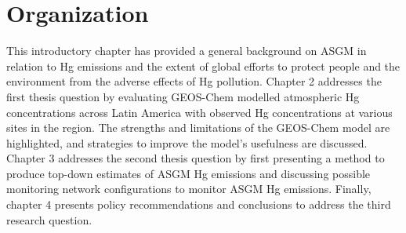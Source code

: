  
\section{Organization}

This introductory chapter has provided a general background on ASGM in relation to Hg emissions and the extent of global efforts to protect people and the environment from the adverse effects of Hg pollution. Chapter 2 addresses the first thesis question by evaluating GEOS-Chem modelled atmospheric Hg concentrations across Latin America with observed Hg concentrations at various sites in the region. The strengths and limitations of the GEOS-Chem model are highlighted, and strategies to improve the model's usefulness are discussed. Chapter 3 addresses the second thesis question by first presenting a method to produce top-down estimates of ASGM Hg emissions and discussing possible monitoring network configurations to monitor ASGM Hg emissions. Finally, chapter 4 presents policy recommendations and conclusions to address the third research question.



